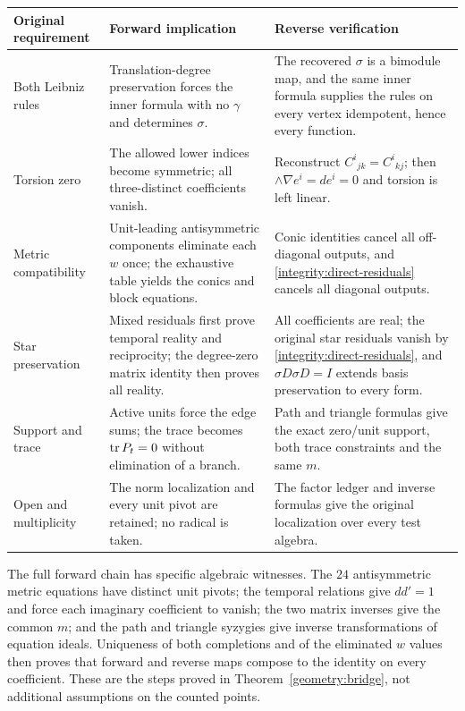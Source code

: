 \documentclass[11pt,a4paper]{article}
\theoremstyle{remark}\newtheorem{remark}[theorem]{Remark}
\begin{document}
\begin{center}\small
\begin{tabular}{p{.20\linewidth}p{.36\linewidth}p{.35\linewidth}}
\hline
Original requirement&Forward implication&Reverse verification\\\hline
Both Leibniz rules&Translation-degree preservation forces the inner
formula with no $\gamma$ and determines $\sigma$.&The recovered
$\sigma$ is a bimodule map, and the same inner formula supplies the
rules on every vertex idempotent, hence every function.\\
Torsion zero&The allowed lower indices become symmetric; all
three-distinct coefficients vanish.&Reconstruct $C^i{}_{jk}=C^i{}_{kj}$;
then $\wedge\nabla e^i=de^i=0$ and torsion is left linear.\\
Metric compatibility&Unit-leading antisymmetric components eliminate
each $w$ once; the exhaustive table yields the conics and block equations.&
Conic identities cancel all off-diagonal outputs, and
\eqref{integrity:direct-residuals} cancels all diagonal outputs.\\
Star preservation&Mixed residuals first prove temporal reality and
reciprocity; the degree-zero matrix identity then proves all reality.&
All coefficients are real; the original star residuals vanish by
\eqref{integrity:direct-residuals}, and $\sigma D\sigma D=I$
extends basis preservation to every form.\\
Support and trace&Active units force the edge sums; the trace becomes
$\operatorname{tr} P_t=0$ without elimination of a branch.&Path and triangle formulas
give the exact zero/unit support, both trace constraints and the same $m$.\\
Open and multiplicity&The norm localization and every unit pivot are
retained; no radical is taken.&The factor ledger and inverse formulas
give the original localization over every test algebra.\\\hline
\end{tabular}
\end{center}

The full forward chain has specific algebraic witnesses. The $24$
antisymmetric metric equations have distinct unit pivots; the temporal
relations give $dd'=1$ and force each imaginary coefficient to vanish;
the two matrix inverses give the common $m$; and the path and triangle
syzygies give inverse transformations of equation ideals. Uniqueness
of both completions and of the eliminated $w$ values then proves
that forward and reverse maps compose to the identity on every
coefficient. These are the steps proved in Theorem~\ref{geometry:bridge},
not additional assumptions on the counted points.
\end{document}
